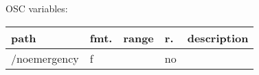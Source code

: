 \begin{snugshade}
{\footnotesize
\label{osctab:glabsensoremergency}
OSC variables:
\nopagebreak

\begin{tabularx}{\textwidth}{llllX}
\hline
path & fmt. & range & r. & description\\
\hline
/noemergency & f &  & no & \\
\hline
\end{tabularx}
}
\end{snugshade}

